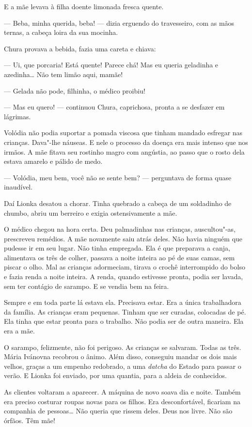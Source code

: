 E a mãe levava à filha doente limonada fresca quente.

--- Beba, minha querida, beba! --- dizia erguendo do travesseiro, com as
mãos ternas, a cabeça loira da sua mocinha.

Chura provava a bebida, fazia uma careta e chiava:

--- Ui, que porcaria! Está quente! Parece chá! Mas eu queria geladinha e
azedinha\ldots{} Não tem limão aqui, mamãe!

--- Gelada não pode, filhinha, o médico proibiu!

--- Mas eu quero! --- continuou Chura, caprichosa, pronta a se desfazer
em lágrimas.

Volódia não podia suportar a pomada viscosa que tinham mandado esfregar
nas crianças. Dava"-lhe náuseas. E nele o processo da doença era mais
intenso que nos irmãos. A mãe fitava seu rostinho magro com angústia, ao
passo que o rosto dela estava amarelo e pálido de medo.

--- Volódia, meu bem, você não se sente bem? --- perguntava de forma
quase inaudível.

Daí Lionka desatou a chorar. Tinha quebrado a cabeça de um soldadinho de
chumbo, abriu um berreiro e exigia ostensivamente a mãe.

O médico chegou na hora certa. Deu palmadinhas nas crianças,
auscultou"-as, prescreveu remédios. A mãe novamente saiu atrás deles. Não
havia ninguém que pudesse ir em seu lugar. Não tinha empregada. Ela é
que preparava a canja, alimentava os três de colher, passava a noite
inteira ao pé de suas camas, sem piscar o olho. Mal as crianças
adormeciam, tirava o crochê interrompido do bolso e fazia renda a noite
inteira. A renda, quando estivesse pronta, podia ser lavada, sem ter
contágio de sarampo. E se vendia bem na feira.

Sempre e em toda parte lá estava ela. Precisava estar. Era a única
trabalhadora da família. As crianças eram pequenas. Tinham que ser
curadas, colocadas de pé. Ela tinha que estar pronta para o trabalho.
Não podia ser de outra maneira. Ela era a mãe.

\asterisc

O sarampo, felizmente, não foi perigoso. As crianças se salvaram. Todas
as três. Mária Ivánovna recobrou o ânimo. Além disso, conseguiu mandar
os dois mais velhos, graças a um empenho redobrado, a uma
\emph{datcha} do Estado para passar o verão. E Lionka foi enviado, por
uma quantia, para a aldeia de conhecidos.

As clientes voltaram a aparecer. A máquina de novo soava dia e noite.
Também era preciso costurar roupas novas para os filhos. Era
desconfortável, ficariam na companhia de pessoas\ldots{} Não queria que
rissem deles. Deus nos livre. Não são órfãos. Têm mãe!

